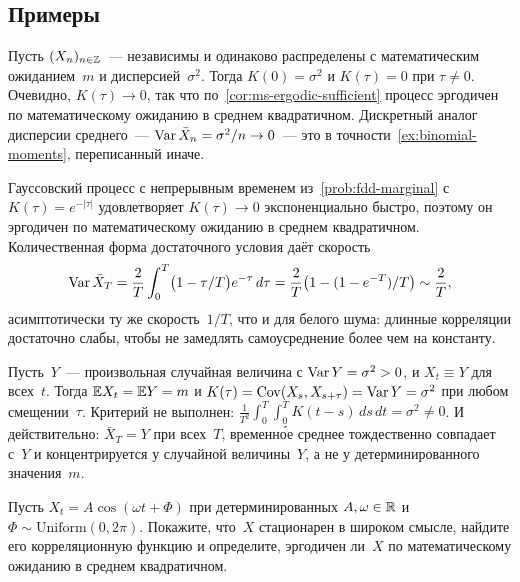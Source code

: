 \subsection*{Примеры}

\begin{example}
\label{ex:white-noise}
Пусть $(X_n)_{n \in \mathbb{Z}}$~--- независимы и одинаково распределены с математическим ожиданием~$m$ и дисперсией~$\sigma^2$. Тогда $K(0) = \sigma^2$ и $K(\tau) = 0$ при $\tau \neq 0$. Очевидно, $K(\tau) \to 0$, так что по~\cref{cor:ms-ergodic-sufficient} процесс эргодичен по математическому ожиданию в среднем квадратичном. Дискретный аналог дисперсии среднего~--- $\operatorname{Var} \bar X_n = \sigma^2/n \to 0$~--- это в точности~\cref{ex:binomial-moments}, переписанный иначе.
\end{example}

\begin{example}
\label{ex:ou-ergodic}
Гауссовский процесс с непрерывным временем из~\cref{prob:fdd-marginal} с $K(\tau) = e^{-|\tau|}$ удовлетворяет $K(\tau) \to 0$ экспоненциально быстро, поэтому он эргодичен по математическому ожиданию в среднем квадратичном. Количественная форма достаточного условия даёт скорость
\[
  \operatorname{Var} \bar X_T = \frac{2}{T} \int_0^T \bigl(1 - \tau/T\bigr) e^{-\tau}\, d\tau = \frac{2}{T}\bigl(1 - (1 - e^{-T})/T\bigr) \sim \frac{2}{T},
\]
асимптотически ту же скорость~$1/T$, что и для белого шума: длинные корреляции достаточно слабы, чтобы не замедлять самоусреднение более чем на константу.
\end{example}

\begin{example}
\label{ex:constant-process}
Пусть~$Y$~--- произвольная случайная величина с $\operatorname{Var} Y = \sigma^2 > 0$, и $X_t \equiv Y$ для всех~$t$. Тогда $\mathbb{E} X_t = \mathbb{E} Y = m$ и $K(\tau) = \operatorname{Cov}(X_s, X_{s + \tau}) = \operatorname{Var} Y = \sigma^2$ при любом смещении~$\tau$. Критерий не выполнен: $\frac{1}{T^2} \int_0^T \int_0^T K(t - s)\, ds\, dt = \sigma^2 \neq 0$. И действительно: $\bar X_T = Y$ при всех~$T$, временн\'{о}е среднее тождественно совпадает с~$Y$ и концентрируется у случайной величины~$Y$, а не у детерминированного значения~$m$.
\end{example}

\begin{problem}
\label{prob:periodic-ergodic}
Пусть $X_t = A \cos(\omega t + \Phi)$ при детерминированных $A, \omega \in \mathbb{R}$ и $\Phi \sim \mathrm{Uniform}(0, 2\pi)$. Покажите, что~$X$ стационарен в широком смысле, найдите его корреляционную функцию и определите, эргодичен ли~$X$ по математическому ожиданию в среднем квадратичном.
\end{problem}

